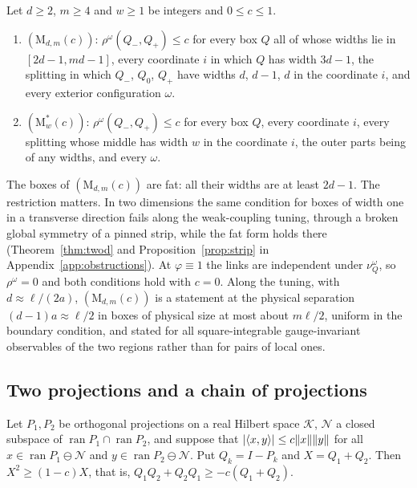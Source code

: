 \begin{definition}\label{def:M}
Let $d\ge2$, $m\ge4$ and $w\ge1$ be integers and $0\le c\le1$.
\begin{enumerate}[label=\textup{(\roman*)},leftmargin=*]
\item $(\mathrm M_{d,m}(c))$: $\rho^\omega(Q_-,Q_+)\le c$ for every box $Q$
all of whose widths lie in $[2d-1,md-1]$, every coordinate $i$ in which $Q$
has width $3d-1$, the splitting in which $Q_-$, $Q_0$, $Q_+$ have widths
$d$, $d-1$, $d$ in the coordinate $i$, and every exterior configuration
$\omega$.
\item $(\mathrm M^*_w(c))$: $\rho^\omega(Q_-,Q_+)\le c$ for every box $Q$,
every coordinate $i$, every splitting whose middle has width $w$ in the
coordinate $i$, the outer parts being of any widths, and every $\omega$.
\end{enumerate}
\end{definition}

The boxes of $(\mathrm M_{d,m}(c))$ are fat: all their widths are at least
$2d-1$. The restriction matters. In two dimensions the same condition for
boxes of width one in a transverse direction fails along the weak-coupling
tuning, through a broken global symmetry of a pinned strip, while the fat
form holds there (Theorem~\ref{thm:twod} and Proposition~\ref{prop:strip}
in Appendix~\ref{app:obstructions}). At $\varphi\equiv1$ the links are
independent under $\nu^\omega_Q$, so $\rho^\omega=0$ and both conditions hold
with $c=0$. Along the tuning, with $d\approx\ell/(2a)$, $(\mathrm
M_{d,m}(c))$ is a statement at the physical separation $(d-1)a\approx\ell/2$
in boxes of physical size at most about $m\ell/2$, uniform in the boundary
condition, and stated for all square-integrable gauge-invariant observables
of the two regions rather than for pairs of local ones.

\subsection{Two projections and a chain of projections}

\begin{lemma}\label{lem:friedrichs}
Let $P_1,P_2$ be orthogonal projections on a real Hilbert space $\mathcal K$,
$\mathcal N$ a closed subspace of $\operatorname{ran}P_1\cap
\operatorname{ran}P_2$, and suppose that $|\langle x,y\rangle|\le c\|x\|\|y\|$ for all
$x\in\operatorname{ran}P_1\ominus\mathcal N$ and $y\in\operatorname{ran}P_2
\ominus\mathcal N$. Put $Q_k=I-P_k$ and $X=Q_1+Q_2$. Then $X^2\ge(1-c)X$,
that is, $Q_1Q_2+Q_2Q_1\ge-c(Q_1+Q_2)$.
\end{lemma}

